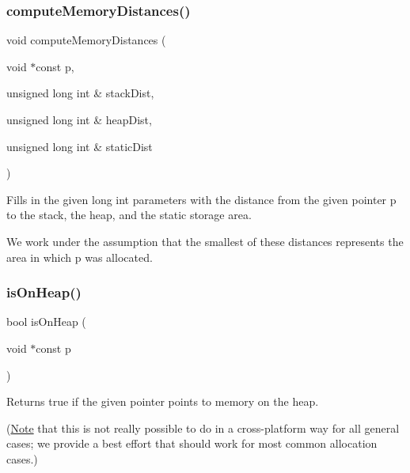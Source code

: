 \subsubsection{\texorpdfstring{compute\+Memory\+Distances()}{computeMemoryDistances()}}
{\footnotesize\ttfamily void compute\+Memory\+Distances (\begin{DoxyParamCaption}\item[{void $\ast$const}]{p,  }\item[{unsigned long int \&}]{stack\+Dist,  }\item[{unsigned long int \&}]{heap\+Dist,  }\item[{unsigned long int \&}]{static\+Dist }\end{DoxyParamCaption})}



Fills in the given long int parameters with the distance from the given pointer p to the stack, the heap, and the static storage area. 

We work under the assumption that the smallest of these distances represents the area in which p was allocated. \mbox{\label{namespacestanfordcpplib_1_1memory_a53377d7db90f7deaa0eac5ff80a65d81}} 
\subsubsection{\texorpdfstring{is\+On\+Heap()}{isOnHeap()}}
{\footnotesize\ttfamily bool is\+On\+Heap (\begin{DoxyParamCaption}\item[{void $\ast$const}]{p }\end{DoxyParamCaption})}



Returns true if the given pointer points to memory on the heap. 

(\mbox{\hyperlink{classNote}{Note}} that this is not really possible to do in a cross-\/platform way for all general cases; we provide a best effort that should work for most common allocation cases.) \mbox{\label{namespacestanfordcpplib_1_1memory_aa1e188da9820e354f8818938e9eae213}} 
